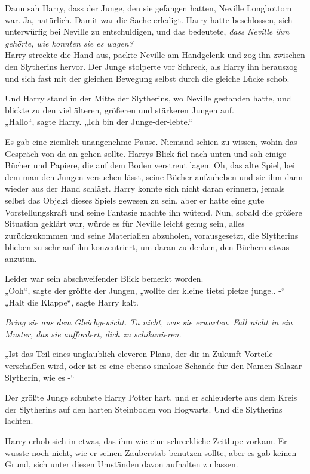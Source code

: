 {Dann sah Harry, dass der Junge, den sie gefangen hatten, Neville Longbottom war. Ja, natürlich. Damit war die Sache erledigt. Harry hatte beschlossen, sich unterwürfig bei Neville zu entschuldigen, und das bedeutete, \emph{dass Neville ihm gehörte, wie konnten sie es wagen?}\\ Harry streckte die Hand aus, packte Neville am Handgelenk und zog ihn zwischen den Slytherins hervor. Der Junge stolperte vor Schreck, als Harry ihn herauszog und sich fast mit der gleichen Bewegung selbst durch die gleiche Lücke schob.

Und Harry stand in der Mitte der Slytherins, wo Neville gestanden hatte, und blickte zu den viel älteren, größeren und stärkeren Jungen auf.\\ „Hallo“, sagte Harry. „Ich bin der Junge-der-lebte.“

Es gab eine ziemlich unangenehme Pause. Niemand schien zu wissen, wohin das Gespräch von da an gehen sollte. Harrys Blick fiel nach unten und sah einige Bücher und Papiere, die auf dem Boden verstreut lagen. Oh, das alte Spiel, bei dem man den Jungen versuchen lässt, seine Bücher aufzuheben und sie ihm dann wieder aus der Hand schlägt. Harry konnte sich nicht daran erinnern, jemals selbst das Objekt dieses Spiels gewesen zu sein, aber er hatte eine gute Vorstellungskraft und seine Fantasie machte ihn wütend. Nun, sobald die größere Situation geklärt war, würde es für Neville leicht genug sein, alles zurückzukommen und seine Materialien abzuholen, vorausgesetzt, die Slytherins blieben zu sehr auf ihn konzentriert, um daran zu denken, den Büchern etwas anzutun.

Leider war sein abschweifender Blick bemerkt worden.\\ „Ooh“, sagte der größte der Jungen, „wollte der kleine tietsi pietze junge.. -“\\ „Halt die Klappe“, sagte Harry kalt.

\emph{Bring sie aus dem Gleichgewicht. Tu nicht, was sie erwarten. Fall nicht in ein Muster, das sie auffordert, dich zu schikanieren.}

„Ist das Teil eines unglaublich cleveren Plans, der dir in Zukunft Vorteile verschaffen wird, oder ist es eine ebenso sinnlose Schande für den Namen Salazar Slytherin, wie es -“

Der größte Junge schubste Harry Potter hart, und er schleuderte aus dem Kreis der Slytherins auf den harten Steinboden von Hogwarts. Und die Slytherins lachten.

Harry erhob sich in etwas, das ihm wie eine schreckliche Zeitlupe vorkam. Er wusste noch nicht, wie er seinen Zauberstab benutzen sollte, aber es gab keinen Grund, sich unter diesen Umständen davon aufhalten zu lassen.

}
